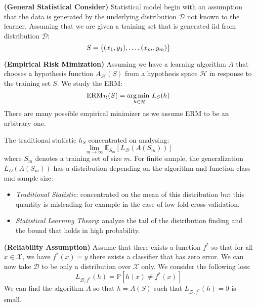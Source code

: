 \begin{definition}{\textbf{(General Statistical Consider)}}
    Statistical model begin with an assumption that the data is generated by the underlying distribution $\mathcal{D}$ not known to the learner. Assuming that we are given a training set that is generated iid from distribution $\mathcal{D}$:
    \begin{equation*}
        S = \left\{ (x_1, y_1),\dots,(x_m, y_m) \right\}
    \end{equation*}
\end{definition}

\begin{definition}{\textbf{(Empirical Risk Mimization)}}
    Assuming we have a learning algorithm $A$ that chooses a hypothesis function $A_\mathcal{H}(S)$ from a hypothesis space $\mathcal{H}$ in response to the training set $S$. We study the ERM:
    \begin{equation*}
        \operatorname{ERM}_\mathcal{H}(S) = \underset{h\in\mathcal{H}}{\arg\min \ }L_S(h)
    \end{equation*}
    There are many possible empirical minimizer as we assume ERM to be an arbitrary one. 
\end{definition}

\begin{remark}
    The traditional statistic $h_S$ concentrated on analysing:
    \begin{equation*}
        \lim_{m\rightarrow\infty}\mathbb{E}_{S_m}[L_\mathcal{D}(A(S_m))]
    \end{equation*}
    where $S_m$ denotes a training set of size $m$. For finite sample, the generalization $L_D(A(S_m))$ has a distribution depending on the algorithm and function class and sample size:
    \begin{itemize}
        \item \emph{Traditional Statistic}: concentrated on the mean of this distribution but this quantity is misleading for example in the case of low fold cross-validation. 
        \item \emph{Statistical Learning Theory}: analyze the tail of the distribution finding and the bound that holds in high probability. 
    \end{itemize}
\end{remark}

\begin{definition}{\textbf{(Reliability Assumption)}}
    Assume that there exists a function $f^*$ so that for all $x \in \mathcal{X}$, we have $f^*(x)=y$ there exists a classifier that has zero error. We can now take $\mathcal{D}$ to be only a distribution over $\mathcal{X}$ only. We consider the following loss:
    \begin{equation*}
        L_{\mathcal{D}, f^*}(h) = \mathbb{P}[h(x) \ne f^*(x)]
    \end{equation*}
    We can find the algorithm $A$ so that $h=A(S)$ such that $L_{\mathcal{D}, f^*}(h)=0$ is small. 
\end{definition}

